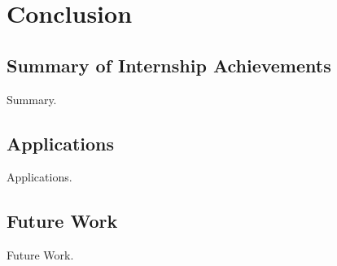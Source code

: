 \chapter{Conclusion}
\label{ch:conclusion}

\section{Summary of Internship Achievements}

Summary.


\section{Applications}

Applications.


\section{Future Work}

Future Work.
